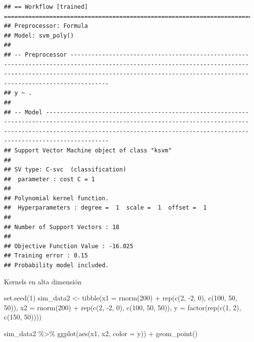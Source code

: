 \documentclass[
  12pt,
]{book}
\newenvironment{Shaded}{\begin{snugshade}}{\end{snugshade}}
\newcommand{\AttributeTok}[1]{\textcolor[rgb]{0.77,0.63,0.00}{#1}}
\newcommand{\DecValTok}[1]{\textcolor[rgb]{0.00,0.00,0.81}{#1}}
\newcommand{\FunctionTok}[1]{\textcolor[rgb]{0.00,0.00,0.00}{#1}}
\newcommand{\NormalTok}[1]{#1}
\newcommand{\OtherTok}[1]{\textcolor[rgb]{0.56,0.35,0.01}{#1}}
\newcommand{\SpecialCharTok}[1]{\textcolor[rgb]{0.00,0.00,0.00}{#1}}
\theoremstyle{definition}
\theoremstyle{definition}
\theoremstyle{definition}
\theoremstyle{definition}
\theoremstyle{remark}
\begin{document}
\begin{verbatim}
## == Workflow [trained] =======================================================================================================================================================================================================================
## Preprocessor: Formula
## Model: svm_poly()
## 
## -- Preprocessor -----------------------------------------------------------------------------------------------------------------------------------------------------------------------------------------------------------------------------
## y ~ .
## 
## -- Model ------------------------------------------------------------------------------------------------------------------------------------------------------------------------------------------------------------------------------------
## Support Vector Machine object of class "ksvm" 
## 
## SV type: C-svc  (classification) 
##  parameter : cost C = 1 
## 
## Polynomial kernel function. 
##  Hyperparameters : degree =  1  scale =  1  offset =  1 
## 
## Number of Support Vectors : 18 
## 
## Objective Function Value : -16.025 
## Training error : 0.15 
## Probability model included.
\end{verbatim}

Kernels en alta dimensión

\begin{Shaded}
\begin{Highlighting}[]
\FunctionTok{set.seed}\NormalTok{(}\DecValTok{1}\NormalTok{)}
\NormalTok{sim\_data2 }\OtherTok{\textless{}{-}} \FunctionTok{tibble}\NormalTok{(}\AttributeTok{x1 =} \FunctionTok{rnorm}\NormalTok{(}\DecValTok{200}\NormalTok{) }\SpecialCharTok{+} \FunctionTok{rep}\NormalTok{(}\FunctionTok{c}\NormalTok{(}\DecValTok{2}\NormalTok{, }\SpecialCharTok{{-}}\DecValTok{2}\NormalTok{,}
    \DecValTok{0}\NormalTok{), }\FunctionTok{c}\NormalTok{(}\DecValTok{100}\NormalTok{, }\DecValTok{50}\NormalTok{, }\DecValTok{50}\NormalTok{)), }\AttributeTok{x2 =} \FunctionTok{rnorm}\NormalTok{(}\DecValTok{200}\NormalTok{) }\SpecialCharTok{+} \FunctionTok{rep}\NormalTok{(}\FunctionTok{c}\NormalTok{(}\DecValTok{2}\NormalTok{,}
    \SpecialCharTok{{-}}\DecValTok{2}\NormalTok{, }\DecValTok{0}\NormalTok{), }\FunctionTok{c}\NormalTok{(}\DecValTok{100}\NormalTok{, }\DecValTok{50}\NormalTok{, }\DecValTok{50}\NormalTok{)), }\AttributeTok{y =} \FunctionTok{factor}\NormalTok{(}\FunctionTok{rep}\NormalTok{(}\FunctionTok{c}\NormalTok{(}\DecValTok{1}\NormalTok{, }\DecValTok{2}\NormalTok{),}
    \FunctionTok{c}\NormalTok{(}\DecValTok{150}\NormalTok{, }\DecValTok{50}\NormalTok{))))}

\NormalTok{sim\_data2 }\SpecialCharTok{\%\textgreater{}\%}
    \FunctionTok{ggplot}\NormalTok{(}\FunctionTok{aes}\NormalTok{(x1, x2, }\AttributeTok{color =}\NormalTok{ y)) }\SpecialCharTok{+} \FunctionTok{geom\_point}\NormalTok{()}
\end{Highlighting}
\end{Shaded}
\end{document}
